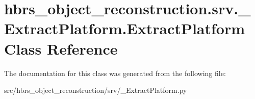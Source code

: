 \hypertarget{classhbrs__object__reconstruction_1_1srv_1_1___extract_platform_1_1_extract_platform}{\section{hbrs\-\_\-object\-\_\-reconstruction.\-srv.\-\_\-\-Extract\-Platform.\-Extract\-Platform \-Class \-Reference}
\label{classhbrs__object__reconstruction_1_1srv_1_1___extract_platform_1_1_extract_platform}
}


\-The documentation for this class was generated from the following file\-:\begin{DoxyCompactItemize}
\item 
src/hbrs\-\_\-object\-\_\-reconstruction/srv/\-\_\-\-Extract\-Platform.\-py\end{DoxyCompactItemize}
